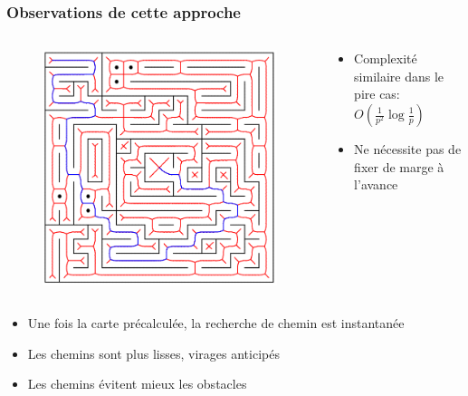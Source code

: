 \begin{frame}
\frametitle{Observations de cette approche}
\begin{columns}
    \begin{column}{.4\textwidth}
        \begin{figure}
            \includegraphics[width=1\linewidth]{assets/BigLabyrinthe.png}
        \end{figure}
    \end{column}
    \begin{column}{.6\textwidth}
        \begin{itemize}
            \item Complexité similaire dans le pire cas: \\ \quad \(O\left (\frac{1}{p^2}\log\frac{1}{p} \right )\)
            \item Ne nécessite pas de fixer de marge à l'avance
        \end{itemize}
    \end{column}
\end{columns}
\begin{itemize}
    \item Une fois la carte précalculée, la recherche de chemin est instantanée
    \item Les chemins sont plus lisses, virages anticipés
    \item Les chemins évitent mieux les obstacles
\end{itemize}
    \end{frame}